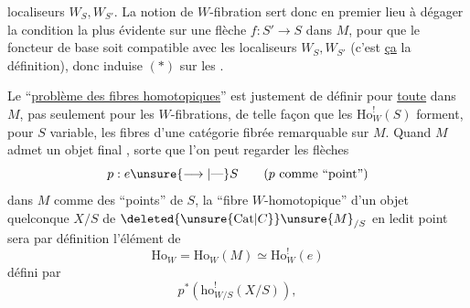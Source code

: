 
localiseurs $W_S,W_{S'}$. La  notion de $W$-fibration sert donc en premier lieu à dégager la condition la plus évidente sur une flèche $f:S'\to S$ dans $M$, pour que  le foncteur  de base  soit compatible avec les localiseurs $W_S,W_{S'}$ (c'est \uline{ça} la définition), donc induise $(*)$ sur les .

Le ``\uline{problème des  fibres homotopiques}'' est justement de définir  pour \uline{toute}  dans $M$, pas seulement pour les $W$-fibrations, de telle façon que les $\mathrm{Ho}^{!}_W(S)$ forment, pour $S$ variable, les fibres d'une catégorie fibrée remarquable sur $M$. Quand $M$ admet un objet final ,  sorte que l'on peut regarder les flèches
\[
p:e\unsure{\longrightarrow|\text{---}}S\qquad\text{($p$ comme ``point'')}
\]
dans $M$ comme des ``points'' de $S$, la ``fibre $W$-homotopique'' d'un objet quelconque $X/S$ de $\deleted{\unsure{\mathrm{Cat}|C}}\unsure{M}_{/S}$ en ledit point sera par définition l'élément de
\[
\mathrm{Ho}_W=\mathrm{Ho}_W(M)\simeq\mathrm{Ho}^{!}_W(e)
\]
défini par
\[
p^*(\mathrm{ho}^{!}_{W/S}(X/S)),
\]
